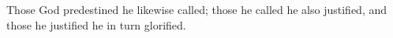 
\lettrine{T}{}hose God predestined he likewise called; those he called he also justified, and those he justified he in turn glorified.